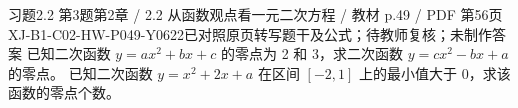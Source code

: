 \par\noindent\begin{minipage}{\linewidth}
\begin{bankitem}{习题2.2 第3题}{第2章 / 2.2 从函数观点看一元二次方程 / 教材 p.49 / PDF 第56页}{XJ-B1-C02-HW-P049-Y0622}{已对照原页转写题干及公式；待教师复核；未制作答案}
已知二次函数 $y=ax^2+bx+c$ 的零点为 2 和 3，求二次函数 $y=cx^2-bx+a$ 的零点。
已知二次函数 $y=x^2+2x+a$ 在区间 $[-2,1]$ 上的最小值大于 0，求该函数的零点个数。
\end{bankitem}
\end{minipage}\par\medskip
